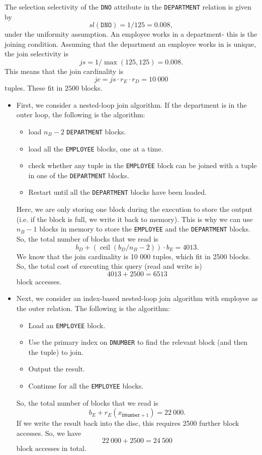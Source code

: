 \documentclass[a4paper, openany]{memoir}
\theoremstyle{definition}
\begin{document}
\begin{answer}
    The selection selectivity of the \texttt{DNO} attribute in the \texttt{DEPARTMENT} relation is given by
    \[\textit{sl}(\texttt{DNO}) = 1/125 = 0.008,\]
    under the uniformity assumption. An employee works in a department- this is the joining condition. Assuming that the department an employee works in is unique, the join selectivity is
    \[\textit{js} = 1/\max(125, 125) = 0.008.\]
    This means that the join cardinality is
    \[\textit{jc} = \textit{js} \cdot r_E \cdot r_D = 10 \ 000\]
    tuples. These fit in $2500$ blocks.
    \begin{itemize}
        \item First, we consider a nested-loop join algorithm. If the department is in the outer loop, the following is the algorithm:
        \begin{itemize}
            \item load $n_B - 2$ \texttt{DEPARTMENT} blocks.
            \item load all the \texttt{EMPLOYEE} blocks, one at a time.
            \item check whether any tuple in the \texttt{EMPLOYEE} block can be joined with a tuple in one of the \texttt{DEPARTMENT} blocks.
            \item Restart until all the \texttt{DEPARTMENT} blocks have been loaded.
        \end{itemize}
        Here, we are only storing one block during the execution to store the output (i.e. if the block is full, we write it back to memory). This is why we can use $n_B - 1$ blocks in memory to store the \texttt{EMPLOYEE} and the \texttt{DEPARTMENT} blocks. So, the total number of blocks that we read is
        \[b_D + (\operatorname{ceil}(b_D / n_B - 2)) \cdot b_E = 4013.\]
        We know that the join cardinality is 10 000 tuples, which fit in 2500 blocks. So, the total cost of executing this query (read and write is)
        \[4013 + 2500 = 6513\]
        block accesses.
        
        \item Next, we consider an index-based nested-loop join algorithm with employee as the outer relation. The following is the algorithm:
        \begin{itemize}
            \item Load an \texttt{EMPLOYEE} block.
            \item Use the primary index on \texttt{DNUMBER} to find the relevant block (and then the tuple) to join.
            \item Output the result.
            \item Continue for all the \texttt{EMPLOYEE} blocks.
        \end{itemize}
        So, the total number of blocks that we read is
        \[b_E + r_E (x_{\texttt{DNumber} + 1}) = 22 \ 000.\]
        If we write the result back into the disc, this requires 2500 further block accesses. So, we have 
        \[22 \ 000 + 2500 = 24 \ 500\]
        block accesses in total.


\end{itemize}
\end{answer}
\end{document}
